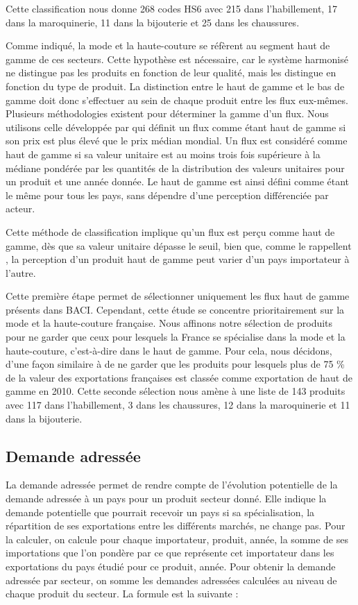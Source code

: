 \documentclass[french,10pt,a4paper]{article}
\begin{document}
Cette classification nous donne 268 codes HS6 avec 215 dans l'habillement, 17 dans la maroquinerie, 11 dans la bijouterie et 25 dans les chaussures. 

Comme indiqué, la mode et la haute-couture se réfèrent au segment haut de gamme de ces secteurs. Cette hypothèse est nécessaire, car le système harmonisé ne distingue pas les produits en fonction de leur qualité, mais les distingue en fonction du type de produit. La distinction entre le haut de gamme et le bas de gamme doit donc s'effectuer au sein de chaque produit entre les flux eux-mêmes. Plusieurs méthodologies existent pour déterminer la gamme d'un flux. Nous utilisons celle développée par \cite{Fontagne1997} qui définit un flux comme étant haut de gamme si son \og prix\fg{} est plus élevé que le \og prix\fg{} médian mondial. Un flux est considéré comme haut de gamme si sa valeur unitaire est au moins trois fois supérieure à la médiane pondérée par les quantités de la distribution des valeurs unitaires pour un produit et une année donnée. Le haut de gamme est ainsi défini comme étant le même pour tous les pays, sans dépendre d'une perception différenciée par acteur.

Cette méthode de classification implique qu'un flux est perçu comme haut de gamme, dès que sa valeur unitaire dépasse le seuil, bien que, comme le rappellent \cite{Martin2015}, la perception d'un produit haut de gamme peut varier d'un pays importateur à l'autre.

Cette première étape permet de sélectionner uniquement les flux haut de gamme présents dans BACI. Cependant, cette étude se concentre prioritairement sur la mode et la haute-couture française. Nous affinons notre sélection de produits pour ne garder que ceux pour lesquels la France se spécialise dans la mode et la haute-couture, c'est-à-dire dans le haut de gamme. Pour cela, nous décidons, d'une façon similaire à \cite{Martin2015} de ne garder que les produits pour lesquels plus de 75 \% de la valeur des exportations françaises est classée comme exportation de haut de gamme en 2010. Cette seconde sélection nous amène à une liste de 143 produits avec 117 dans l'habillement, 3 dans les chaussures, 12 dans la maroquinerie et 11 dans la bijouterie.

\subsection*{Demande adressée}

La demande adressée permet de rendre compte de l'évolution potentielle de la demande adressée à un pays pour un produit secteur donné. Elle indique la demande potentielle que pourrait recevoir un pays si sa spécialisation, la répartition de ses exportations entre les différents marchés, ne change pas. Pour la calculer, on calcule pour chaque importateur, produit, année, la somme de ses importations que l'on pondère par ce que représente cet importateur dans les exportations du pays étudié pour ce produit, année. Pour obtenir la demande adressée par secteur, on somme les demandes adressées calculées au niveau de chaque produit du secteur. La formule est la suivante :
\end{document}
